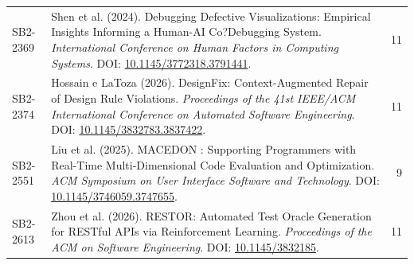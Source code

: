 \begin{small}
\begin{longtable}{lp{11.2cm}r}
SB2-2369 & Shen et al. (2024). Debugging Defective Visualizations: Empirical Insights Informing a Human-AI Co?Debugging System. \textit{International Conference on Human Factors in Computing Systems}. DOI: \url{10.1145/3772318.3791441}. & 11 \\
SB2-2374 & Hossain e LaToza (2026). DesignFix: Context-Augmented Repair of Design Rule Violations. \textit{Proceedings of the 41st IEEE/ACM International Conference on Automated Software Engineering}. DOI: \url{10.1145/3832783.3837422}. & 11 \\
SB2-2551 & Liu et al. (2025). MACEDON : Supporting Programmers with Real-Time Multi-Dimensional Code Evaluation and Optimization. \textit{ACM Symposium on User Interface Software and Technology}. DOI: \url{10.1145/3746059.3747655}. & 9 \\
SB2-2613 & Zhou et al. (2026). RESTOR: Automated Test Oracle Generation for RESTful APIs via Reinforcement Learning. \textit{Proceedings of the ACM on Software Engineering}. DOI: \url{10.1145/3832185}. & 11 \\
\hline
\end{longtable}
\end{small}